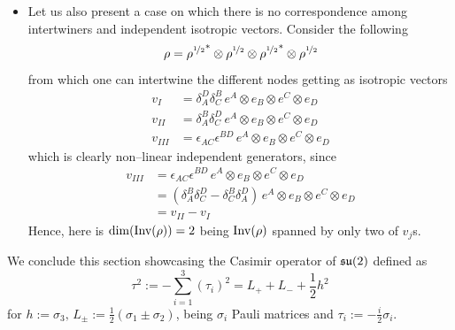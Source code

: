 \begin{example}
\begin{itemize}
     
    
    
    


    \item Let us also present a case on which there is no correspondence among intertwiners and independent isotropic vectors. Consider the following
    $$\rho={\rho^{\nicefrac{1}{2}}}^*\otimes\rho^{\nicefrac{1}{2}}\otimes{\rho^{\nicefrac{1}{2}}}^*\otimes\rho^{\nicefrac{1}{2}}$$
    from which one can intertwine the different nodes getting as isotropic vectors 
    \begin{align*}
        v_I&=\delta_A^D\delta_C^B\,e^A\otimes e_B\otimes e^C\otimes e_D\\
        v_{II}&=\delta_A^B\delta_C^D\,e^A\otimes e_B\otimes e^C \otimes e_D\\
        v_{III}&=\epsilon_{AC}\epsilon^{BD}\,e^A\otimes e_B\otimes e^C \otimes e_D
    \end{align*}
    which is clearly non--linear independent generators, since
    \begin{align*}
        v_{III}&=\epsilon_{AC}\epsilon^{BD}\,e^A\otimes e_B\otimes e^C \otimes e_D\\
        &=\left(\delta_A^B\delta_C^D-\delta_C^B\delta_A^D\right)\,e^A\otimes e_B\otimes e^C \otimes e_D\\
        &=v_{II}-v_I
    \end{align*}
    Hence, here is $\dim(\text{\normalfont Inv}(\rho))=2$ being $\text{\normalfont Inv}(\rho)$ spanned by only two of $v_j$s.
    \end{itemize}
\end{example}

We conclude this section showcasing the Casimir operator of $\mathfrak{su}(2)$ defined as
$$\tau^2:=-\sum_{i=1}^3(\tau_i)^2=L_++L_-+\frac{1}{2}h^2$$
for $h:=\sigma_3,\,L_{\pm}:=\frac{1}{2}(\sigma_1\pm\sigma_2)$, being $\sigma_i$ Pauli matrices and $\tau_i:=-\frac{i}{2}\sigma_i$.

